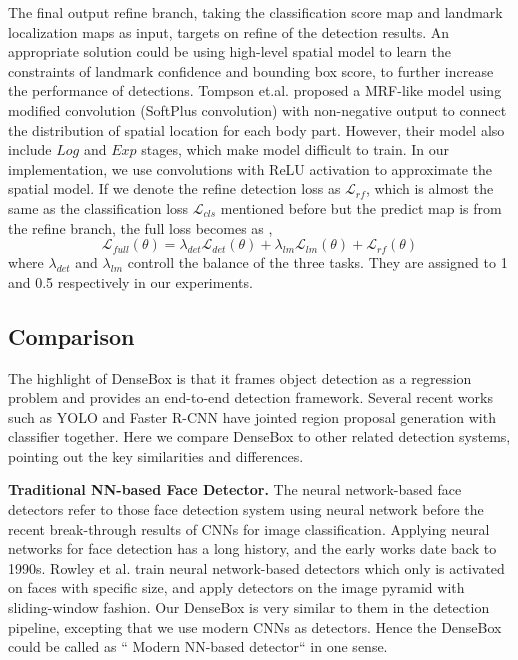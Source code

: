 The final output refine branch, taking the classification score map and landmark localization maps as input, targets on refine of the detection results.  An appropriate solution could be using high-level spatial model to learn the constraints of landmark confidence and bounding box score, to further increase the performance of detections. Tompson et.al.\cite{tompson2014joint} proposed a MRF-like model using modified convolution (SoftPlus convolution) with non-negative output to connect the distribution of spatial location for each body part.  However, their model also include $Log$ and $Exp$ stages, which make model difficult to train.  In our implementation, we use convolutions with ReLU activation to approximate the spatial model.  If we denote the refine detection loss as $\mathcal{L} _{rf}$, which is almost the same as the classification loss $\mathcal{L} _{cls}$ mentioned before but the predict map is from the refine branch, the full loss becomes as ,
	\begin{equation}\label{eq:eq_full_loss}
	\mathcal{L} _{full}(\theta) = \lambda_{det} \mathcal{L} _{det}(\theta) + \lambda_{lm} \mathcal{L} _{lm}(\theta) + \mathcal{L} _{rf}(\theta)
	\end{equation}
where $\lambda_{det}$ and $\lambda_{lm}$ controll the balance of the three tasks. They are assigned to 1 and 0.5 respectively in our experiments. 

\subsection{Comparison } 
The highlight of DenseBox is that it frames object detection as a regression problem and provides an end-to-end detection framework.  Several recent works such as YOLO and Faster R-CNN have jointed region proposal generation with classifier together. Here we compare DenseBox to other related detection systems, pointing out the key similarities and differences. 
 
\textbf{Traditional NN-based Face Detector.} The neural network-based face detectors refer to those face detection system using neural network before the recent break-through results of CNNs for image classification. Applying neural networks for face detection has a long history, and the early works date back to 1990s\cite{vaillant1994original}.  Rowley et al.\cite{rowley1998neural} train neural network-based detectors which only is activated on faces with specific size, and apply detectors on the image pyramid with sliding-window fashion. Our DenseBox is very similar to them in the detection pipeline, excepting that we use modern CNNs as detectors. Hence the DenseBox could be called as `` Modern NN-based detector“ in one sense. 

